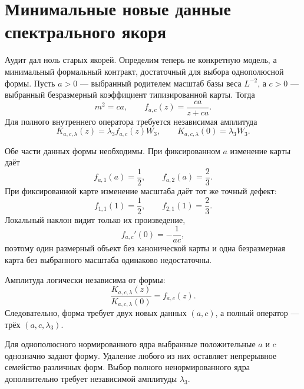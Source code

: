 \chapter{Минимальные новые данные спектрального якоря}
\label{ch:v8-baryon-spectral-scale-anchor-minimal-new-data-gate}

Аудит дал ноль старых якорей. Определим теперь не конкретную модель, а
минимальный формальный контракт, достаточный для выбора однополюсной формы.
Пусть $a>0$ --- выбранный родителем масштаб базы веса $L^{-2}$, а $c>0$ ---
выбранный безразмерный коэффициент типизированной карты. Тогда
\begin{equation}
 m^2=ca,
 \qquad
 f_{a,c}(z)=\frac{ca}{z+ca}.
 \label{eq:v8-baryon-minimal-anchor-shape}
\end{equation}
Для полного внутреннего оператора требуется независимая амплитуда
\begin{equation}
 K_{a,c,\lambda}(z)=\lambda_3f_{a,c}(z)W_3,
 \qquad K_{a,c,\lambda}(0)=\lambda_3W_3.
 \label{eq:v8-baryon-minimal-anchor-kernel}
\end{equation}

Обе части данных формы необходимы. При фиксированном $a$ изменение карты
даёт
\begin{equation}
 f_{a,1}(a)=\frac12,
 \qquad f_{a,2}(a)=\frac23.
 \label{eq:v8-baryon-minimal-anchor-map-witness}
\end{equation}
При фиксированной карте изменение масштаба даёт тот же точный дефект:
\begin{equation}
 f_{1,1}(1)=\frac12,
 \qquad f_{2,1}(1)=\frac23.
 \label{eq:v8-baryon-minimal-anchor-scale-witness}
\end{equation}
Локальный наклон видит только их произведение,
\begin{equation}
 f_{a,c}'(0)=-\frac1{ac},
 \label{eq:v8-baryon-minimal-anchor-slope}
\end{equation}
поэтому один размерный объект без канонической карты и одна безразмерная
карта без выбранного масштаба одинаково недостаточны.

Амплитуда логически независима от формы:
\begin{equation}
 \frac{K_{a,c,\lambda}(z)}{K_{a,c,\lambda}(0)}=f_{a,c}(z).
 \label{eq:v8-baryon-minimal-anchor-amplitude-separation}
\end{equation}
Следовательно, форма требует двух новых данных $(a,c)$, а полный оператор ---
трёх $(a,c,\lambda_3)$.

\begin{theorem}
Для однополюсного нормированного ядра выбранные положительные $a$ и $c$
однозначно задают форму. Удаление любого из них оставляет непрерывное
семейство различных форм. Выбор полного ненормированного ядра дополнительно
требует независимой амплитуды $\lambda_3$.
\end{theorem}

